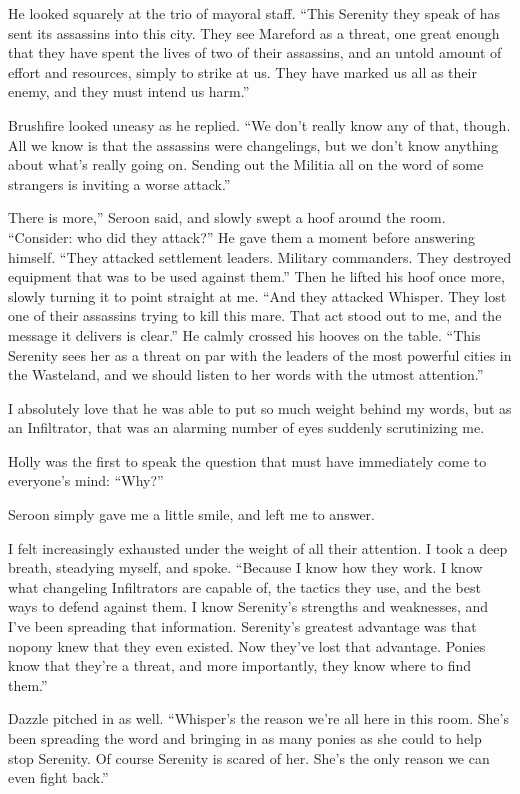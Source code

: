 He looked squarely at the trio of mayoral staff. “This Serenity they speak of has sent its assassins into this city. They see Mareford as a threat, one great enough that they have spent the lives of two of their assassins, and an untold amount of effort and resources, simply to strike at us. They have marked us all as their enemy, and they must intend us harm.”

Brushfire looked uneasy as he replied. “We don’t really know any of that, though. All we know is that the assassins were changelings, but we don’t know anything about what’s really going on. Sending out the Militia all on the word of some strangers is inviting a worse attack.”

\leavevmode{}There is more,” Seroon said, and slowly swept a hoof around the room. “Consider: who did they attack?” He gave them a moment before answering himself. “They attacked settlement leaders. Military commanders. They destroyed equipment that was to be used against them.” Then he lifted his hoof once more, slowly turning it to point straight at me. “And they attacked Whisper. They lost one of their assassins trying to kill this mare. That act stood out to me, and the message it delivers is clear.” He calmly crossed his hooves on the table. “This Serenity sees her as a threat on par with the leaders of the most powerful cities in the Wasteland, and we should listen to her words with the utmost attention.”

I absolutely love that he was able to put so much weight behind my words, but as an Infiltrator, that was an alarming number of eyes suddenly scrutinizing me.

Holly was the first to speak the question that must have immediately come to everyone’s mind: “Why?”

Seroon simply gave me a little smile, and left me to answer.

I felt increasingly exhausted under the weight of all their attention. I took a deep breath, steadying myself, and spoke. “Because I know how they work. I know what changeling Infiltrators are capable of, the tactics they use, and the best ways to defend against them. I know Serenity’s strengths and weaknesses, and I’ve been spreading that information. Serenity’s greatest advantage was that nopony knew that they even existed. Now they’ve lost that advantage. Ponies know that they’re a threat, and more importantly, they know where to find them.”

Dazzle pitched in as well. “Whisper’s the reason we’re all here in this room. She’s been spreading the word and bringing in as many ponies as she could to help stop Serenity. Of course Serenity is scared of her. She’s the only reason we can even fight back.”

